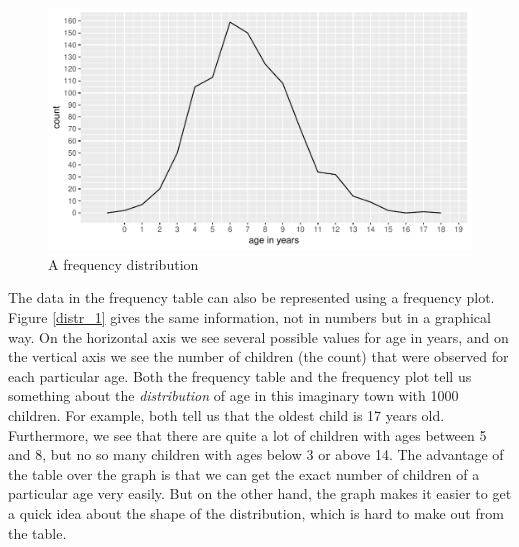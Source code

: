 \documentclass[]{report}\usepackage[]{graphicx}\usepackage[]{color}
\makeatletter
\def\maxwidth{ %
  \ifdim\Gin@nat@width>\linewidth
    \linewidth
  \else
    \Gin@nat@width
  \fi
}
\newenvironment{knitrout}{}{} %
\makeatother
\begin{document}
\begin{knitrout}
\color{fgcolor}\begin{figure}

{\centering \includegraphics[width=\maxwidth]{figure/distr_1-1} 

}

\caption[A frequency distribution]{A frequency distribution}\label{fig:distr_1}
\end{figure}


\end{knitrout}

The data in the frequency table can also be represented using a frequency plot. Figure \ref{distr_1} gives the same information, not in numbers but in a graphical way. On the horizontal axis we see several possible values for age in years, and on the vertical axis we see the number of children (the count) that were observed for each particular age. Both the frequency table and the frequency plot tell us something about the \textit{distribution} of age in this imaginary town with 1000 children. For example, both tell us that the oldest child is 17 years old. Furthermore, we see that there are quite a lot of children with ages between 5 and 8, but no so many children with ages below 3 or above 14. The advantage of the table over the graph is that we can get the exact number of children of a particular age very easily. But on the other hand, the graph makes it easier to get a quick idea about the shape of the distribution, which is hard to make out from the table. 

\end{document}
